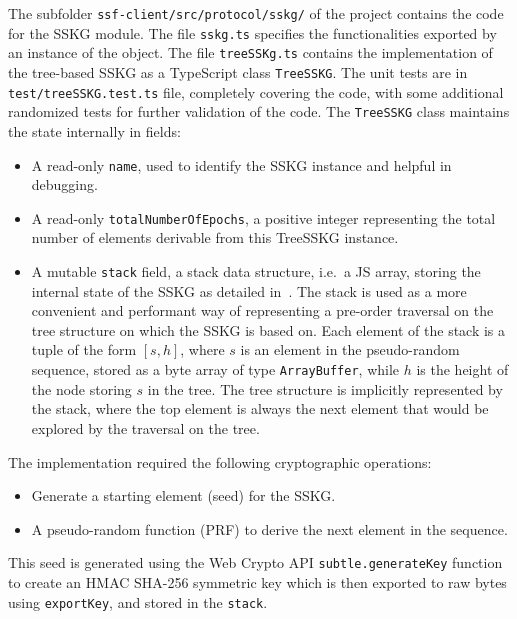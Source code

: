 The subfolder \texttt{ssf-client/src/protocol/sskg/} of the project contains the code for the SSKG module.
The file \texttt{sskg.ts} specifies the functionalities exported by an instance of the object.
The file \texttt{treeSSKg.ts} contains the implementation of the tree-based SSKG
as a TypeScript class \texttt{TreeSSKG}. The unit tests are in \texttt{test/treeSSKG.test.ts} file,
completely covering the code, with some additional randomized tests for further validation of the code.
The \texttt{TreeSSKG} class maintains the state internally in fields:
\begin{itemize}
    \item A read-only \texttt{name}, used to identify the SSKG instance and helpful in debugging.
    \item A read-only \texttt{totalNumberOfEpochs}, a positive integer representing the total number of elements derivable from this TreeSSKG instance.
    \item A mutable \texttt{stack} field, a stack data structure, i.e.\ a JS array, storing the internal state of the SSKG as detailed in~\cite{ESORICS:MarPoe14}.
    The stack is used as a more convenient and performant way of 
    representing a pre-order traversal on the tree structure on 
    which the SSKG is based on. Each element of the stack is a tuple 
    of the form $[s, h]$, where $s$ is an element in the pseudo-random 
    sequence, stored as a byte array of type \texttt{ArrayBuffer}, 
    while $h$ is the height of the node storing $s$ in the tree.
    The tree structure is implicitly represented by the stack,
    where the top element is always the next element that would
    be explored by the traversal on the tree.
\end{itemize}

The implementation required the following cryptographic operations:
\begin{itemize}
    \item Generate a starting element (seed) for the SSKG.
    \item A pseudo-random function (PRF) to derive the next element in the sequence. 
\end{itemize}

This seed is generated using the Web Crypto API \texttt{subtle.generateKey} function 
to create an HMAC SHA-256 symmetric key which is then exported to raw bytes using \texttt{exportKey},
and stored in the \texttt{stack}.

